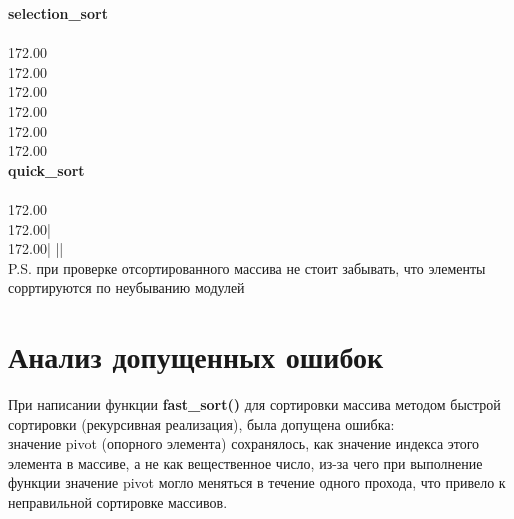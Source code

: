 \documentclass[a4paper,10pt]{article}
\begin{document}
    \textbf{selection\_sort} \\
    \vspace{0.1cm}\\
    172.00\qquad \\
    172.00\qquad \\
    172.00\qquad \\
    172.00\qquad \\
    172.00\qquad \\
    172.00\qquad \\
    
    \vspace{0.1cm}
    \textbf{quick\_sort} \\
    \vspace{0.1cm}\\
    172.00\qquad \\ 
    172.00\quad | \qquad \\ 
    172.00\quad | \quad|\quad| \qquad \\ 
    
    \vspace{0.5cm}
    \small{P.S. при проверке отсортированного массива не стоит забывать, что элементы сорртируются по неубыванию модулей}
    \vspace{1.5cm}

    \section{Анализ допущенных ошибок}
    \vspace{0,5cm}
    При написании функции 
    \textbf{fast\_sort()} для сортировки массива методом быстрой сортировки (рекурсивная реализация), была допущена ошибка: \\
    значение pivot (опорного элемента) сохранялось, как значение индекса этого элемента в массиве, а не как вещественное число, из-за чего при выполнение функции значение pivot могло меняться в течение одного прохода, что привело к неправильной сортировке массивов.   
\end{document}
